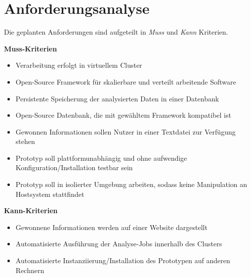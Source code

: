 \chapter{Anforderungsanalyse}
\label{cha:Anforderungsanalyse}

Die geplanten Anforderungen sind aufgeteilt in \textit{Muss} und \textit{Kann} Kriterien.

\textbf{Muss-Kriterien}

\begin{itemize}
\item Verarbeitung erfolgt in virtuellem Cluster
\item Open-Source Framework für skalierbare und verteilt arbeitende Software
\item Persistente Speicherung der analysierten Daten in einer Datenbank
\item Open-Source Datenbank, die mit gewähltem Framework kompatibel ist
\item Gewonnen Informationen sollen Nutzer in einer Textdatei zur Verfügung stehen
\item Prototyp soll plattformunabhängig und ohne aufwendige Konfiguration/Installation testbar sein
\item Prototyp soll in isolierter Umgebung arbeiten, sodass keine Manipulation an Hostsystem stattfindet
\end{itemize}

\textbf{Kann-Kriterien}

\begin{itemize}
\item Gewonnene Informationen werden auf einer Website dargestellt
\item Automatisierte Ausführung der Analyse-Jobs innerhalb des Clusters
\item Automatisierte Instanziierung/Installation des Prototypen auf anderen Rechnern 
\end{itemize}
